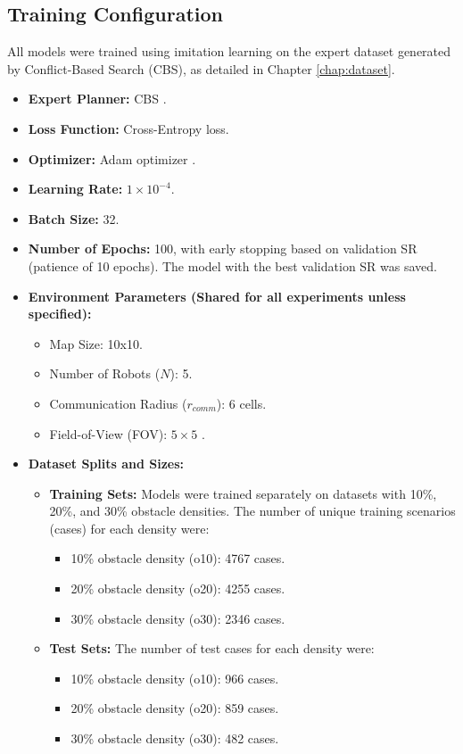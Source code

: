 \subsection{Training Configuration}
\label{subsec:training_config}
All models were trained using imitation learning on the expert dataset generated by Conflict-Based Search (CBS), as detailed in Chapter \ref{chap:dataset}.
\begin{itemize}
    \item \textbf{Expert Planner:} CBS \cite{Sharon2015CBS}.
    \item \textbf{Loss Function:} Cross-Entropy loss.
    \item \textbf{Optimizer:} Adam optimizer \cite{Kingma2014Adam}.
    \item \textbf{Learning Rate:} $1 \times 10^{-4}$.
    \item \textbf{Batch Size:} 32.
    \item \textbf{Number of Epochs:} 100, with early stopping based on validation SR (patience of 10 epochs). The model with the best validation SR was saved.
    \item \textbf{Environment Parameters (Shared for all experiments unless specified):}
        \begin{itemize}
            \item Map Size: 10x10.
            \item Number of Robots ($N$): 5.
            \item Communication Radius ($r_{comm}$): 6 cells.
            \item Field-of-View (FOV): $5 \times 5$ .
        \end{itemize}
    \item \textbf{Dataset Splits and Sizes:}
    \begin{itemize}
        \item \textbf{Training Sets:} Models were trained separately on datasets with 10\%, 20\%, and 30\% obstacle densities. The number of unique training scenarios (cases) for each density were:
            \begin{itemize}
                \item 10\% obstacle density (o10): 4767 cases.
                \item 20\% obstacle density (o20): 4255 cases.
                \item 30\% obstacle density (o30): 2346 cases.
            \end{itemize}

        \item \textbf{Test Sets:} The number of test cases for each density were:
            \begin{itemize}
                \item 10\% obstacle density (o10): 966 cases.
                \item 20\% obstacle density (o20): 859 cases.
                \item 30\% obstacle density (o30): 482 cases.
            \end{itemize}


\end{itemize}
\end{itemize}
